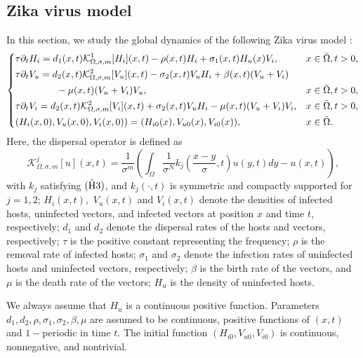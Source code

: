 \documentclass[11pt,reqno]{amsart}
\numberwithin{equation}{section}
\begin{document}
\subsection{Zika virus model}
In this section, we study the global dynamics of the following Zika virus model \cite{LZ,MWW,WFLS}:
\begin{equation}\label{4-1}
\left\{
\begin{aligned}
&\tau \partial_{t} H_{i} =d_{1}(x,t)\mathcal{K}^{1}_{\Omega,\sigma,m}[H_{i}](x,t)-\rho(x,t)H_{i}+\sigma_{1}(x,t)H_{u}(x)V_{i}, &x&\in \bar\Omega, t>0,\\
&\tau \partial_{t} V_{u}
=d_{2}(x,t)\mathcal{K}^{2}_{\Omega,\sigma,m}[V_{u}](x,t)-\sigma_{2}(x,t)V_{u}H_{i}+\beta(x,t)(V_{u}+V_{i})\\
&\hspace{1.5cm}-\mu(x,t)(V_{u}+V_{i})V_{u}, &x&\in \bar\Omega, t>0, \\
&\tau \partial_{t} V_{i}
=d_{2}(x,t)\mathcal{K}^{2}_{\Omega,\sigma,m}[V_{i}](x,t)+\sigma_{2}(x,t)V_{u}H_{i}-\mu(x,t)(V_{u}+V_{i})V_{i}, &x&\in \bar\Omega, t>0,\\
&(H_{i}(x,0), V_{u}(x,0), V_{i}(x,0))=(H_{i0}(x), V_{u0}(x), V_{i0}(x)), &x&\in\bar\Omega.
\end{aligned}
\right.
\end{equation}
Here, the dispersal operator is defined as
\begin{equation*}
\mathcal{K}^{j}_{\Omega,\sigma,m}[u](x,t) =
\frac{1}{\sigma^{m}}\left( \int_{\Omega}\frac{1}{\sigma^{N}} k_{j} \left( \frac{x-y}{\sigma},t \right)u(y,t)dy - u(x,t) \right),
\end{equation*}
with $k_{j}$ satisfying $\rm{(\tilde{H}3) }$, and $k_{j}(\cdot,t)$ is symmetric and compactly supported for $j=1, 2$;
$H_{i}(x,t),$ $V_{u}(x,t)$ and $V_{i}(x,t)$ denote the densities of infected hosts, uninfected vectors, and infected vectors at position $x$ and time $t$, respectively;
$d_{1}$ and $d_{2}$ denote the dispersal rates of the hosts and vectors, respectively;
$\tau$ is the positive constant representing the frequency;
$\rho$ is the removal rate of infected hosts; $\sigma_{1}$ and $\sigma_{2}$ denote the infection rates of uninfected hosts and uninfected vectors, respectively; $\beta$ is the birth rate of the vectors, and $\mu$ is the death rate of the vectors;
$H_{u}$ is the density of uninfected hosts.

We always assume that $H_{u}$ is a continuous positive function. Parameters $d_{1},d_{2},\rho, \sigma_{1}, \sigma_{2}, \beta, \mu$ are assumed to be continuous, positive functions of $(x,t)$ and $1-$periodic in time $t$. The initial function $(H_{i0}, V_{u0}, V_{i0})$ is continuous, nonnegative, and nontrivial.
\end{document}
